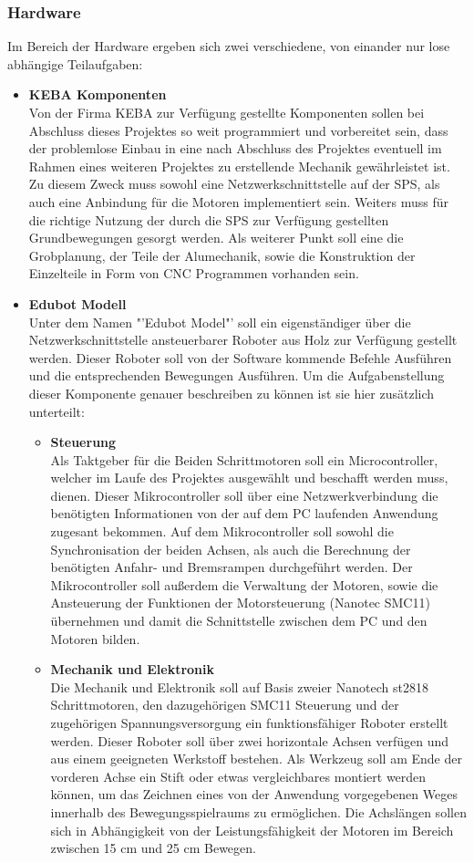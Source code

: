 \subsubsection{Hardware}
Im Bereich der Hardware ergeben sich zwei verschiedene, von einander nur lose abhängige Teilaufgaben:
\begin{itemize}
\item \textbf{KEBA Komponenten}\\
Von der Firma KEBA zur Verfügung gestellte Komponenten sollen bei Abschluss dieses Projektes so weit programmiert und vorbereitet sein, dass der problemlose Einbau in eine nach Abschluss des Projektes eventuell im Rahmen eines weiteren Projektes zu erstellende Mechanik gewährleistet ist. Zu diesem Zweck muss sowohl eine Netzwerkschnittstelle auf der SPS, als auch eine Anbindung für die Motoren implementiert sein. Weiters muss für die richtige Nutzung der durch die SPS zur Verfügung gestellten Grundbewegungen gesorgt werden.
Als weiterer Punkt soll eine die Grobplanung, der Teile der Alumechanik, sowie die Konstruktion der Einzelteile in Form von CNC Programmen vorhanden sein.
\item \textbf{Edubot Modell}\\
Unter dem Namen "'Edubot Model"' soll ein eigenständiger über die Netzwerkschnittstelle ansteuerbarer Roboter aus Holz zur Verfügung gestellt werden. Dieser Roboter soll von der Software kommende Befehle Ausführen und die entsprechenden Bewegungen Ausführen. Um die Aufgabenstellung dieser Komponente genauer beschreiben zu können ist sie hier zusätzlich unterteilt:
\begin{itemize}
\item \textbf{Steuerung}\\
Als Taktgeber für die Beiden Schrittmotoren soll ein Microcontroller, welcher im Laufe des Projektes ausgewählt und beschafft werden muss, dienen. Dieser Mikrocontroller soll über eine Netzwerkverbindung die benötigten Informationen von der auf dem PC laufenden Anwendung zugesant bekommen.
Auf dem Mikrocontroller soll sowohl die Synchronisation der beiden Achsen, als auch die Berechnung der benötigten Anfahr- und Bremsrampen durchgeführt werden. Der Mikrocontroller soll außerdem die Verwaltung der Motoren, sowie die Ansteuerung der Funktionen der Motorsteuerung (Nanotec SMC11) übernehmen und damit die Schnittstelle zwischen dem PC und den Motoren bilden.
\item \textbf{Mechanik und Elektronik}\\
Die Mechanik und Elektronik soll auf Basis zweier Nanotech st2818 Schrittmotoren, den dazugehörigen SMC11 Steuerung und der zugehörigen Spannungsversorgung ein funktionsfähiger Roboter erstellt werden. Dieser Roboter soll über zwei horizontale Achsen verfügen und aus einem geeigneten Werkstoff bestehen. Als Werkzeug soll am Ende der vorderen Achse ein Stift oder etwas vergleichbares montiert werden können, um das Zeichnen eines von der Anwendung vorgegebenen Weges innerhalb des Bewegungsspielraums zu ermöglichen. Die Achslängen sollen sich in Abhängigkeit von der Leistungsfähigkeit der Motoren im Bereich zwischen 15 cm und 25 cm Bewegen.
\end{itemize}  
\end{itemize}  

 


